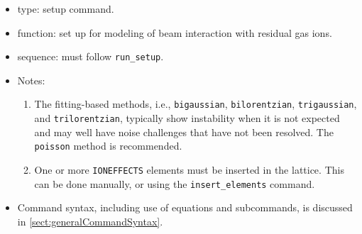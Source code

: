 \documentclass[11pt]{article}
\begin{document}
\begin{itemize}
\item type: setup command.
\item function: set up for modeling of beam interaction with residual gas ions.
\item sequence: must follow \verb|run_setup|.
\item Notes:
  \begin{enumerate}
  \item The fitting-based methods, i.e., \verb|bigaussian|, \verb|bilorentzian|, 
    \verb|trigaussian|, and \verb|trilorentzian|, typically show instability when it is not expected and
    may well have noise challenges that have not been resolved.  The \verb|poisson| method is recommended.
  \item One or more \verb|IONEFFECTS| elements must be inserted in the lattice. This can be
    done manually, or using the \verb|insert_elements| command.
  \end{enumerate}
\item Command syntax, including use of equations and subcommands, is discussed in \ref{sect:generalCommandSyntax}.
\end{itemize}
\end{document}
